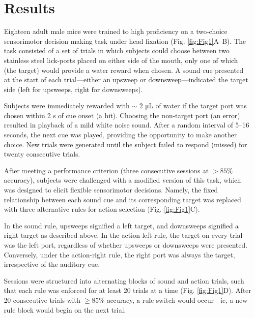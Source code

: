 \section*{Results}

Eighteen adult male mice were trained to high proficiency on a two-choice sensorimotor decision making task under head fixation (Fig. \ref{fig:Fig1}A--B). The task consisted of a set of trials in which subjects could choose between two stainless steel lick-ports placed on either side of the mouth, only one of which (the target) would provide a water reward when chosen. A sound cue presented at the start of each trial---either an upsweep or downsweep---indicated the target side (left for upsweeps, right for downsweeps).



Subjects were immediately rewarded with $\sim$ 2 \si{\uL} of water if the target port was chosen within 2 s of cue onset (a hit). Choosing the non-target port (an error) resulted in playback of a mild white noise sound. After a random interval of 5--16 seconds, the next cue was played, providing the opportunity to make another choice. New trials were generated until the subject failed to respond (missed) for twenty consecutive trials.

After meeting a performance criterion (three consecutive sessions at $>85\%$  accuracy), subjects were challenged with a modified version of this task, which was designed to elicit flexible sensorimotor decisions. Namely, the fixed relationship between each sound cue and its corresponding target was replaced with three alternative rules for action selection (Fig. \ref{fig:Fig1}C). 

In the sound rule, upsweeps signified a left target, and downsweeps signified a right target as described above. In the action-left rule, the target on every trial was the left port, regardless of whether upsweeps or downsweeps were presented. Conversely, under the action-right rule, the right port was always the target, irrespective of the auditory cue. 

Sessions were structured into alternating blocks of sound and action trials, such that each rule was enforced for at least 20 trials at a time (Fig. \ref{fig:Fig1}D). After 20 consecutive trials with $\geq 85\%$  accuracy, a rule-switch would occur---ie, a new rule block would begin on the next trial.

